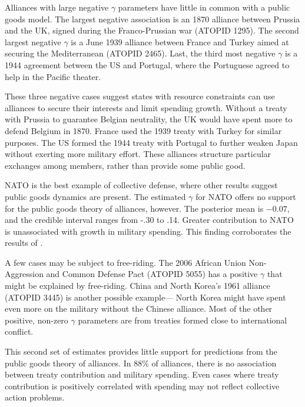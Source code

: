 \documentclass[12pt]{article}
\begin{document}
Alliances with large negative $\gamma$ parameters have little in common with a public goods model. 
The largest negative association is an 1870 alliance between Prussia and the UK, signed during the Franco-Prussian war (ATOPID 1295). 
The second largest negative $\gamma$ is a June 1939 alliance between France and Turkey aimed at securing the Mediterranean (ATOPID 2465).
Last, the third most negative $\gamma$ is a 1944 agreement between the US and Portugal, where the Portuguese agreed to help in the Pacific theater. 


These three negative cases suggest states with resource constraints can use alliances to secure their interests and limit spending growth. 
Without a treaty with Prussia to guarantee Belgian neutrality, the UK would have spent more to defend Belgium in 1870.
France used the 1939 treaty with Turkey for similar purposes. 
The US formed the 1944 treaty with Portugal to further weaken Japan without exerting more military effort. 
These alliances structure particular exchanges among members, rather than provide some public good. 


NATO is the best example of collective defense, where other results suggest public goods dynamics are present. 
The estimated $\gamma$ for NATO offers no support for the public goods theory of alliances, however. 
The posterior mean is $-0.07$, and the credible interval ranges from -.30 to .14.  
Greater contribution to NATO is unassociated with growth in military spending. 
This finding corroborates the results of \citet{PluemperNeumayer2015}. 


A few cases may be subject to free-riding. 
The 2006 African Union Non-Aggression and Common Defense Pact (ATOPID 5055) has a positive $\gamma$ that might be explained by free-riding.  
China and North Korea's 1961 alliance (ATOPID 3445) is another possible example--- North Korea might have spent even more on the military without the Chinese alliance. 
Most of the other positive, non-zero $\gamma$ parameters are from treaties formed close to international conflict. 


This second set of estimates provides little support for predictions from the public goods theory of alliances. 
In 88\% of alliances, there is no association between treaty contribution and military spending. 
Even cases where treaty contribution is positively correlated with spending may not reflect collective action problems. 

\end{document}
